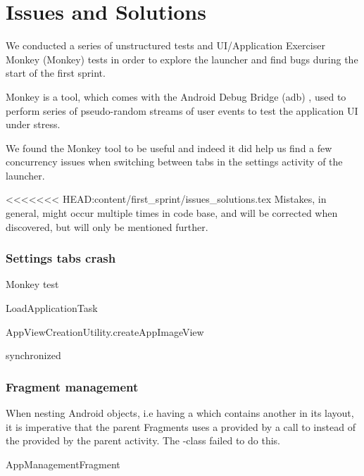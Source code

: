 
\chapter{Issues and Solutions}

We conducted a series of unstructured tests and UI/Application Exerciser Monkey (Monkey) \parencite{android_monkey} tests in order to explore the launcher and find bugs during the start of the first sprint. 

Monkey is a tool, which comes with the Android Debug Bridge (adb) \parencite{android_adb}, used to perform series of pseudo-random streams of user events to test the application UI under stress.

We found the Monkey tool to be useful and indeed it did help us find a few concurrency issues when switching between tabs in the settings activity of the launcher.

<<<<<<< HEAD:content/first_sprint/issues_solutions.tex
Mistakes, in general, might occur multiple times in code base, and will be corrected when discovered, but will only be  mentioned further.



\subsection{Settings tabs crash}



Monkey test

LoadApplicationTask

AppViewCreationUtility.createAppImageView

synchronized

\subsection{Fragment management}

When nesting Android  objects, i.e having a  which contains another  in its layout, it is imperative that the parent Fragments uses a  provided by a call to  instead of the  provided by the parent activity. The \giraf-class  failed to do this.   

AppManagementFragment




